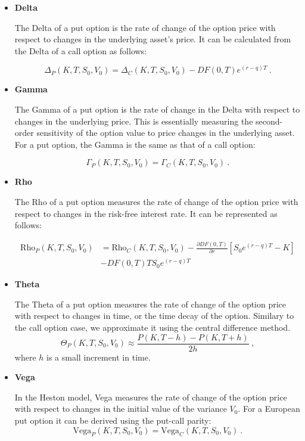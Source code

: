 \begin{itemize}

\item \textbf{Delta} 

The Delta of a put option is the rate of change of the option price with respect to changes in the underlying asset's price. It can be calculated from the Delta of a call option as follows:

$$
\Delta_P(K,T,S_0,V_0) = \Delta_C(K,T, S_0, V_0) - DF(0,T) e^{(r-q) T} \ .
$$


\item \textbf{Gamma} 

The Gamma of a put option is the rate of change in the Delta with respect to changes in the underlying price. This is essentially measuring the second-order sensitivity of the option value to price changes in the underlying asset. For a put option, the Gamma is the same as that of a call option:

$$
\Gamma_P(K,T,S_0,V_0) = \Gamma_C(K,T, S_0, V_0) \ .
$$



\item \textbf{Rho} 

The Rho of a put option measures the rate of change of the option price with respect to changes in the risk-free interest rate. It can be represented as follows:

$$
\begin{aligned}
\text{Rho}_P(K,T,S_0,V_0) &= \text{Rho}_C(K,T, S_0, V_0) - \frac{\partial DF(0,T)}{\partial r}\left[ S_0 e^{(r-q) T} - K \right] 
\\
&-
DF(0,T) T S_0 e^{(r-q) T} 
\end{aligned}
$$



\item \textbf{Theta} 

The Theta of a put option measures the rate of change of the option price with respect to changes in time, or the time decay of the option. Similary to the call option case, we approximate it using the central difference method. 
$$
 \Theta_P(K,T,S_0,V_0) \approx \frac{P(K,T-h) - P(K,T+h)}{2h} \ ,
$$
where $h$ is a small increment in time. 


\item \textbf{Vega} 

In the Heston model, Vega measures the rate of change of the option price with respect to changes in the initial value of the variance $V_0$. For a European put option it can be derived using the put-call parity:
$$
\text{Vega}_P(K,T,S_0,V_0) = \text{Vega}_C(K,T, S_0, V_0) \ .
$$

\end{itemize}









